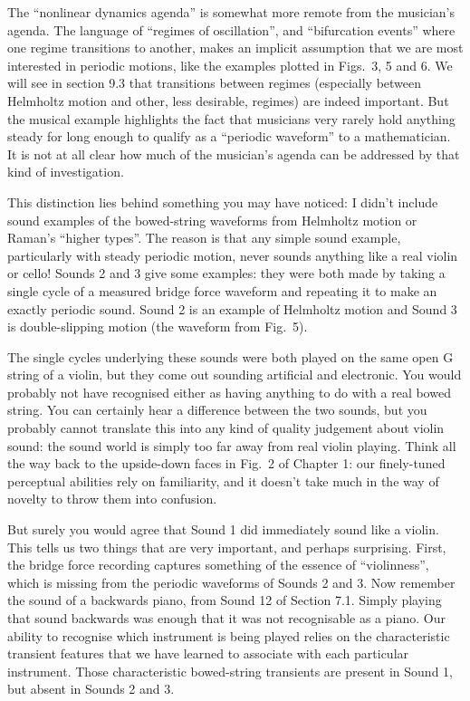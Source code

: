   The “nonlinear dynamics agenda” is somewhat more remote from the musician’s 
  agenda. The language of “regimes of oscillation”, and “bifurcation events” 
  where one regime transitions to another, makes an implicit assumption that we 
  are most interested in periodic motions, like the examples plotted in Figs.\ 
  3, 5 and 6. We will see in section 9.3 that transitions between regimes 
  (especially between Helmholtz motion and other, less desirable, regimes) are 
  indeed important. But the musical example highlights the fact that musicians 
  very rarely hold anything steady for long enough to qualify as a “periodic 
  waveform” to a mathematician. It is not at all clear how much of the 
  musician’s agenda can be addressed by that kind of investigation. 

  This distinction lies behind something you may have noticed: I didn’t include 
  sound examples of the bowed-string waveforms from Helmholtz motion or Raman’s 
  “higher types”. The reason is that any simple sound example, particularly 
  with steady periodic motion, never sounds anything like a real violin or 
  cello! Sounds 2 and 3 give some examples: they were both made by taking a 
  single cycle of a measured bridge force waveform and repeating it to make an 
  exactly periodic sound. Sound 2 is an example of Helmholtz motion and Sound 3 
  is double-slipping motion (the waveform from Fig.\ 5). 

  The single cycles underlying these sounds were both played on the same open G 
  string of a violin, but they come out sounding artificial and electronic. You 
  would probably not have recognised either as having anything to do with a 
  real bowed string. You can certainly hear a difference between the two 
  sounds, but you probably cannot translate this into any kind of quality 
  judgement about violin sound: the sound world is simply too far away from 
  real violin playing. Think all the way back to the upside-down faces in Fig.\ 
  2 of Chapter 1: our finely-tuned perceptual abilities rely on familiarity, 
  and it doesn’t take much in the way of novelty to throw them into confusion. 

  But surely you would agree that Sound 1 did immediately sound like a violin. 
  This tells us two things that are very important, and perhaps surprising. 
  First, the bridge force recording captures something of the essence of 
  “violinness”, which is missing from the periodic waveforms of Sounds 2 and 3. 
  Now remember the sound of a backwards piano, from Sound 12 of Section 7.1. 
  Simply playing that sound backwards was enough that it was not recognisable 
  as a piano. Our ability to recognise which instrument is being played relies 
  on the characteristic transient features that we have learned to associate 
  with each particular instrument. Those characteristic bowed-string transients 
  are present in Sound 1, but absent in Sounds 2 and 3. 

